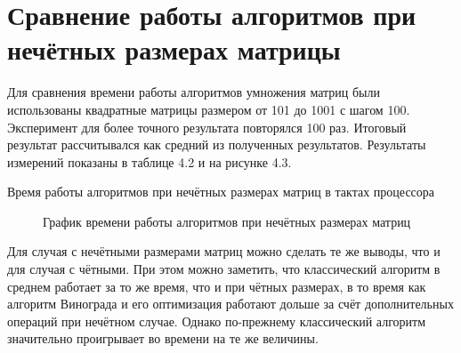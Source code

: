 \documentclass[12pt, a4paper]{report}
\begin{document}
	\section{Сравнение работы алгоритмов при нечётных размерах матрицы}
	Для сравнения времени работы алгоритмов умножения матриц были использованы квадратные матрицы размером от 101 до 1001 с шагом 100. Эксперимент для более точного результата повторялся 100 раз. Итоговый результат рассчитывался как средний из полученных результатов. Результаты измерений показаны в таблице 4.2 и на рисунке 4.3.\\
	
	\begin{table}[ht!]
		\caption{Время работы алгоритмов при нечётных размерах матриц в тактах процессора}
		\begin{center}
		\end{center}
	\end{table}

	\begin{figure}[ht!]
		\caption{График времени работы алгоритмов при нечётных размерах матриц}
	\end{figure}
	
 	Для случая с нечётными размерами матриц можно сделать те же выводы, что и для случая с чётными. При этом можно заметить, что классический алгоритм в среднем работает за то же время, что и при чётных размерах, в то время как алгоритм Винограда и его оптимизация работают дольше за счёт дополнительных операций при нечётном случае. Однако по-прежнему классический алгоритм значительно проигрывает во времени на те же величины.
\end{document}
